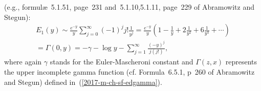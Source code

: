 {(e.g., formul\ae~5.1.51, page~231 and~5.1.10,5.1.11, page~229  of Abramowitz and Stegun):
\begin{equation}
\begin{split}
E_1(y)
\sim
\frac{e^{-y}}{y}\sum_{j=0}^\infty (-1)^j j!  \frac{1}{y^j} =
\frac{e^{-y}}{y} \left( 1 - \frac{1}{y}  + 2 \frac{1}{y^2} + 6 \frac{1}{y^3} + \cdots
\right) \\
 = \Gamma \left( 0, y \right)=- \gamma - \log y - \sum_{j=1}^\infty \frac{ (-y)^j }{j (j!)}
,
\end{split}
\label{2019-m-ch-ds-Stieltjes-Ei-se}
\end{equation}
where again $\gamma$ stands for the Euler-Mascheroni constant
and $\Gamma (z,x)$ represents the upper incomplete gamma function
(cf. Formula~6.5.1, p~260   of Abramowitz and Stegun)
defined in~(\ref{2017-m-ch-sf-edgamma}).


}
